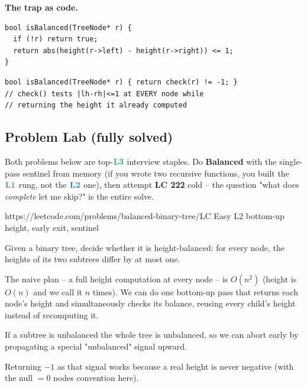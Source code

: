 \smallskip\noindent\textbf{The trap as code.}

\begin{lstlisting}[caption={\textcolor{warningred}{WRONG -- root-only balance test}}, basicstyle=\ttfamily\small, breaklines=true]
bool isBalanced(TreeNode* r) {
  if (!r) return true;
  return abs(height(r->left) - height(r->right)) <= 1;
}
\end{lstlisting}
\begin{lstlisting}[caption={\textcolor{successgreen}{RIGHT -- per-node check via the $-1$ sentinel (first solved problem)}}, basicstyle=\ttfamily\small, breaklines=true]
bool isBalanced(TreeNode* r) { return check(r) != -1; }
// check() tests |lh-rh|<=1 at EVERY node while
// returning the height it already computed
\end{lstlisting}

\subsection{Problem Lab (fully solved)}

\begin{attemptgate}
Both problems below are top-$\lv3$ interview staples. Do \textbf{Balanced} with the
single-pass sentinel from memory (if you wrote two recursive functions, you built the
$\lv1$ rung, not the $\lv2$ one), then attempt \textbf{LC 222} cold -- the question
"what does \emph{complete} let me skip?" is the entire solve.
\end{attemptgate}

  {https://leetcode.com/problems/balanced-binary-tree/}{LC Easy L2}
  {bottom-up height, early exit, sentinel}

\begin{problemstatement}
Given a binary tree, decide whether it is height-balanced: for every node, the heights of
its two subtrees differ by at most one.
\end{problemstatement}

The naive plan -- a full height computation at every node -- is $O(n^2)$ (height is
$O(n)$ and we call it $n$ times). We can do one bottom-up pass that returns each node's
height and simultaneously checks its balance, reusing every child's height instead of
recomputing it.

\begin{observation}
If a subtree is unbalanced the whole tree is unbalanced, so we can abort early by
propagating a special "unbalanced" signal upward.
\end{observation}
\begin{observation}
Returning $-1$ as that signal works because a real height is never negative (with the
null $=0$ nodes convention here).
\end{observation}


